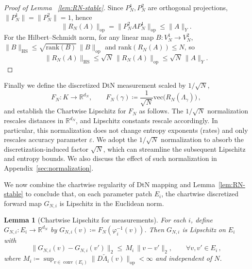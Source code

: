\documentclass{article}
\newcommand{\R}{\mathbb{R}}
\newtheorem{lemma}[theorem]{Lemma}
\newcommand{\conv}{\operatorname{conv}}
\begin{document}
\begin{proof}[Proof of Lemma ~\ref{lem:RN-stable}]
Since $P_N^1,P_N^2$ are orthogonal projections, $\|P_N^1\|=\|P_N^2\|=1$, hence
\[
\|R_N(A)\|_{\mathrm{op}}=\|P_N^2AP_N^1\|_{\mathrm{op}}\le \|A\|_Y.
\]
For the Hilbert--Schmidt norm, for any linear map $B:V_N^1\to V_N^2$,
$\|B\|_{\mathrm{HS}}\le \sqrt{\mathrm{rank}(B)}\,\|B\|_{\mathrm{op}}$ and
$\mathrm{rank}(R_N(A))\le N$, so
\[
\|R_N(A)\|_{\mathrm{HS}}
\le \sqrt{N}\,\|R_N(A)\|_{\mathrm{op}}
\le \sqrt{N}\,\|A\|_Y.
\]
\end{proof}
Finally we define the discretized DtN measurement scaled by $1/\sqrt{N}$,
\begin{equation}\label{eqn:F_N}
F_N:K\to\R^{d_N},\qquad F_N(\gamma)\coloneqq \frac{1}{\sqrt{N}}\mathrm{vec}\big(R_N(\Lambda_\gamma)\big)\,,
\end{equation}
and establish the Chartwise Lipschitz for $F_N$ as follows. The $1 / \sqrt{N}$ normalization rescales distances in $\R^{d_N}$, and Lipschitz constants rescale accordingly. In particular, this normalization does not change entropy exponents (rates) and only rescales accuracy parameter $\varepsilon$. We adopt the $1/\sqrt{N}$ normalization to absorb the discretization-induced factor $\sqrt{N}$, which can streamline the subsequent Lipschitz and entropy bounds. We also discuss the effect of such normalization in Appendix~\ref{sec:normalization}.

We now combine the chartwise regularity of DtN mapping and Lemma~\ref{lem:RN-stable} to conclude that, on each parameter patch $E_i$, the chartwise discretized forward map $G_{N,i}$ is Lipschitz in the Euclidean norm.
\begin{lemma}[Chartwise Lipschitz for measurements]\label{lem:GN-Lip}
For each $i$, define $G_{N,i}:E_i\to\R^{d_N}$ by $G_{N,i}(v)\coloneqq F_N(\varphi_i^{-1}(v))$.
Then $G_{N,i}$ is Lipschitz on $E_i$ with
\[
\|G_{N,i}(v)-G_{N,i}(v')\|_2 \le \,M_i\,\|v-v'\|_2,\qquad \forall v,v'\in E_i\,,
\]
where $M_i\coloneqq \sup_{v\in\conv(E_i)}\|D\widetilde\Lambda_i(v)\|_{\mathrm{op}}<\infty$ and independent of $N$.

\end{lemma}
\end{document}
